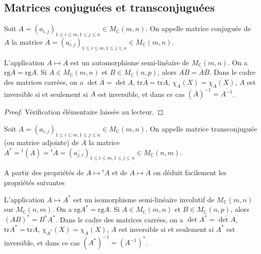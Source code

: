 \subsection{Matrices conjuguées et transconjuguées}

\begin{de}
Soit $A = (a_{i,j})_{1\leq i\leq m,1\leq j\leq n} \in M_\mathbb{C}(m,n)$. On appelle matrice conjuguée de $A$ la matrice $\overline{A} = (\overline{a_{i,j}})_{1\leq i\leq m,1\leq j\leq n} \in M_\mathbb{C}(m,n)$.
\end{de}

\begin{prop}
L'application $A \mapsto \overline{A}$ est un automorphisme semi-linéaire de $M_\mathbb{C}(m,n)$. On a $\mathrm{rg} \overline{A} = \mathrm{rg} A$. Si $A \in M_\mathbb{C}(m,n)$ et $B \in M_\mathbb{C}(n,p)$, alors $\overline{AB} = \overline{A} \overline{B}$. Dans le cadre des matrices carrées, on a $\det \overline{A} = \overline{\det A}$, $\mathrm{tr} \overline{A} = \overline{\mathrm{tr} A}$, $\chi_{\overline{A}}(X) = \overline{\chi_A(X)}$, $A$ est inversible si et seulement si $\overline{A}$ est inversible, et dans ce cas $(\overline{A})^{-1} = \overline{A^{-1}}$.
\end{prop}

\begin{proof}
Vérification élémentaire laissée au lecteur.
\end{proof}

\begin{de}
Soit $A = (a_{i,j})_{1\leq i\leq m,1\leq j\leq n} \in M_\mathbb{C}(m,n)$. On appelle matrice transconjuguée (ou matrice adjointe) de $A$ la matrice $A^* = {}^t(\overline{A}) = \overline{{}^t A} = (\overline{a_{j,i}})_{1\leq i\leq m,1\leq j\leq n} \in M_\mathbb{C}(n,m)$.
\end{de}

A partir des propriétés de $A \mapsto {}^t A$ et de $A \mapsto \overline{A}$ on déduit facilement les propriétés suivantes

\begin{prop}
L'application $A \mapsto A^*$ est un isomorphisme semi-linéaire involutif de $M_\mathbb{C}(m,n)$ sur $M_\mathbb{C}(n,m)$. On a $\mathrm{rg} A^* = \mathrm{rg} A$. Si $A \in M_\mathbb{C}(m,n)$ et $B \in M_\mathbb{C}(n,p)$, alors $(AB)^* = B^* A^*$. Dans le cadre des matrices carrées, on a $\det A^* = \overline{\det A}$, $\mathrm{tr} A^* = \overline{\mathrm{tr} A}$, $\chi_{A^*}(X) = \overline{\chi_A(X)}$, $A$ est inversible si et seulement si $A^*$ est inversible, et dans ce cas $(A^*)^{-1} = (A^{-1})^*$.
\end{prop}

